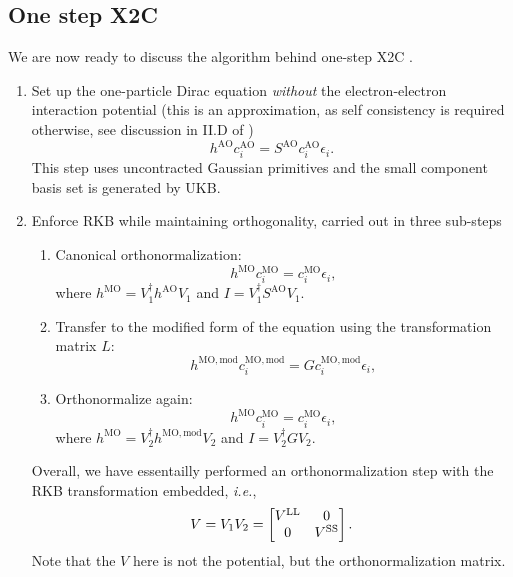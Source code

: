 \documentclass{article}
\begin{document}
\subsection{One step X2C}
We are now ready to discuss the algorithm behind one-step X2C \cite{iliasInfiniteorderTwocomponentRelativistic2007a}. 

\begin{enumerate}
\item Set up the one-particle Dirac equation \textit{without} the electron-electron interaction potential (this is an approximation, as self consistency is required otherwise, see discussion in II.D of \cite{iliasInfiniteorderTwocomponentRelativistic2007a})
\begin{equation}
    h^{\mathrm{AO}}c_i^{\mathrm{AO}}=S^{\mathrm{AO}}c_i^{\mathrm{AO}}\epsilon_i.
\end{equation}
This step uses uncontracted Gaussian primitives and the small component basis set is generated by UKB.
\item Enforce RKB while maintaining orthogonality, carried out in three sub-steps
\begin{enumerate}
\item Canonical orthonormalization:
\begin{equation}
    h^{\mathrm{MO}}c_i^{\mathrm{MO}}=c_i^{\mathrm{MO}}\epsilon_i,
\end{equation}
where $h^{\mathrm{MO}}=V_1^{\dagger}h^{\mathrm{AO}}V_1$ and $I=V_1^{\dagger}S^{\mathrm{AO}}V_1$.
\item Transfer to the modified form of the equation using the transformation matrix $L$:
\begin{equation}
    {h}^{\mathrm{MO,mod}}{c}_i^{\mathrm{MO,mod}}={G}{c}_i^{\mathrm{MO,mod}}\epsilon_i,
\end{equation}
\item Orthonormalize again:
\begin{equation}
\label{eq:x2c}
    h^{\mathrm{MO}}c_i^{\mathrm{MO}}=c_i^{\mathrm{MO}}\epsilon_i,
\end{equation}
where $h^{\mathrm{MO}}=V_2^{\dagger}{h}^{\mathrm{MO,mod}}V_2$ and $I=V_2^{\dagger}GV_2$.
\end{enumerate}
Overall, we have essentailly performed an orthonormalization step with the RKB transformation embedded, \textit{i.e.},
\begin{equation}
    V=V_1V_2=\begin{bmatrix}{V^{\mathrm{LL}}}&{0}\\{0}&{V^{\mathrm{SS}}}\end{bmatrix}.
\end{equation}
Note that the $V$ here is not the potential, but the orthonormalization matrix.

\end{enumerate}
\end{document}
